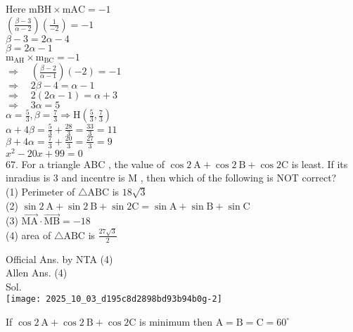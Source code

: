 \documentclass[10pt]{article}
\begin{document}
Here \(\mathrm{mBH} \times \mathrm{mAC}=-1\)\\
\(\left(\frac{\beta-3}{\alpha-2}\right)\left(\frac{1}{-2}\right)=-1\)\\
\(\beta-3=2 \alpha-4\)\\
\(\beta=2 \alpha-1\)\\
\(\mathrm{m}_{\mathrm{AH}} \times \mathrm{m}_{\mathrm{BC}}=-1\)\\
\(\Rightarrow \quad\left(\frac{\beta-2}{\alpha-1}\right)(-2)=-1\)\\
\(\Rightarrow \quad 2 \beta-4=\alpha-1\)\\
\(\Rightarrow \quad 2(2 \alpha-1)=\alpha+3\)\\
\(\Rightarrow \quad 3 \alpha=5\)\\
\(\alpha=\frac{5}{3}, \beta=\frac{7}{3} \Rightarrow \mathrm{H}\left(\frac{5}{3}, \frac{7}{3}\right)\)\\
\(\alpha+4 \beta=\frac{5}{3}+\frac{28}{3}=\frac{33}{3}=11\)\\
\(\beta+4 \alpha=\frac{7}{3}+\frac{20}{3}=\frac{27}{3}=9\)\\
\(x^{2}-20 x+99=0\)\\
67. For a triangle ABC , the value of \(\cos 2 \mathrm{~A}+\cos 2 \mathrm{~B}+\cos 2 \mathrm{C}\) is least. If its inradius is 3 and incentre is M , then which of the following is NOT correct?\\
(1) Perimeter of \(\triangle \mathrm{ABC}\) is \(18 \sqrt{3}\)\\
(2) \(\sin 2 \mathrm{~A}+\sin 2 \mathrm{~B}+\sin 2 \mathrm{C}=\sin \mathrm{A}+\sin \mathrm{B}+\sin \mathrm{C}\)\\
(3) \(\overrightarrow{\mathrm{MA}} \cdot \overrightarrow{\mathrm{MB}}=-18\)\\
(4) area of \(\triangle \mathrm{ABC}\) is \(\frac{27 \sqrt{3}}{2}\)

Official Ans. by NTA (4)\\
Allen Ans. (4)\\
Sol.\\
\texttt{[image: 2025\_10\_03\_d195c8d2898bd93b94b0g-2]}

If \(\cos 2 \mathrm{~A}+\cos 2 \mathrm{~B}+\cos 2 \mathrm{C}\) is minimum then \(\mathrm{A}= \mathrm{B}=\mathrm{C}=60^{\circ}\)
\end{document}
